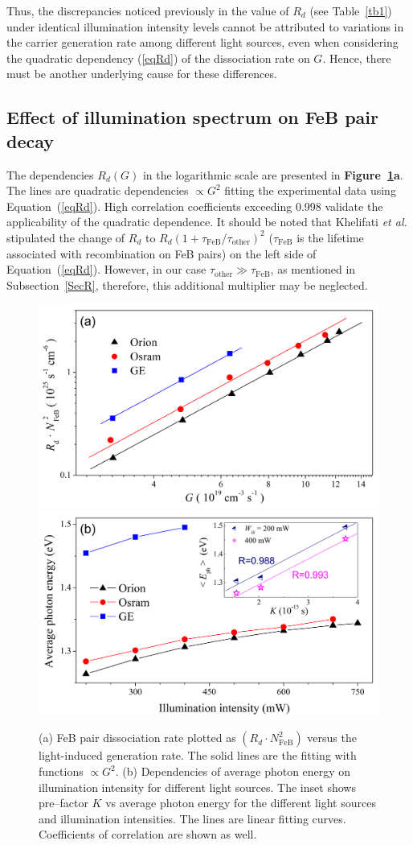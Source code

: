 \documentclass{WileyMSP-template}
\begin{document}
Thus, the discrepancies noticed previously in the value of $R_d$ (see Table~\ref{tb1}) under identical illumination intensity levels
cannot be attributed to variations in the carrier generation rate among different light sources,
even when considering the quadratic dependency (\ref{eqRd}) of the dissociation rate on $G$.
Hence, there must be another underlying cause for these differences.


\subsection{Effect of illumination spectrum on FeB pair decay}\label{SecLast}

The dependencies $R_d (G)$ in the logarithmic scale are presented in \textbf{Figure~\ref{fig6}a}.
The lines are quadratic dependencies $\propto G^2$ fitting the experimental data using Equation~(\ref{eqRd}).
High correlation coefficients exceeding 0.998 validate the applicability of the quadratic dependence.
It should be noted that Khelifati \emph{et al.} \cite{FeBKin2019} stipulated the change of $R_d$ to
$R_d\left(1+\tau_\mathrm{FeB}/\tau_\mathrm{other}\right)^2$ ($\tau_\mathrm{FeB}$ is the lifetime associated with recombination on FeB pairs)
on the left side of Equation~(\ref{eqRd}).
However, in our case $\tau_\mathrm{other}\gg \tau_\mathrm{FeB}$, as mentioned in Subsection~\ref{SecR}, therefore,
this additional multiplier may be neglected.


\begin{figure}
\centering
  \includegraphics[width=0.4\linewidth]{Fig6a.png}
  \includegraphics[width=0.4\linewidth]{Fig6b.png}
  \caption{
  (a) FeB pair dissociation rate plotted as $\left(R_d\cdot N_\mathrm{FeB}^2\right)$ versus the light-induced
  generation rate. The solid lines are the fitting with functions $\propto G^2$.
  (b) Dependencies of average photon energy on illumination intensity for different light sources.
  The inset shows pre--factor $K$ vs average photon energy for the different light sources and illumination intensities.
  The lines are linear fitting curves. Coefficients of correlation are shown as well.
  }
  \label{fig6}
\end{figure}
\end{document}
